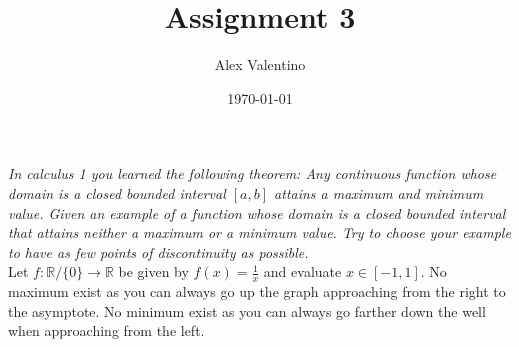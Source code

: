 \documentclass[12pt, letterpaper]{article}
\date{\today}
\author{Alex Valentino}
\title{Assignment 3}
\newcommand{\R}{\mathbb{R}}
\begin{document}
	\textit{In calculus 1 you learned the following theorem: Any continuous function whose domain is
a closed bounded interval $[a, b]$ attains a maximum and minimum value. Given an example
of a function whose domain is a closed bounded interval that attains neither a maximum
or a minimum value. Try to choose your example to have as few points of discontinuity as
possible.}\\
Let $f: \R / \{0\} \to \R$ be given by $f(x) = \frac{1}{x}$ and evaluate $x \in [-1,1].$  No maximum exist as you can always go up the graph approaching from the right to the asymptote.  No minimum exist as you can always go farther down the well when approaching from the left.  
\end{document}
